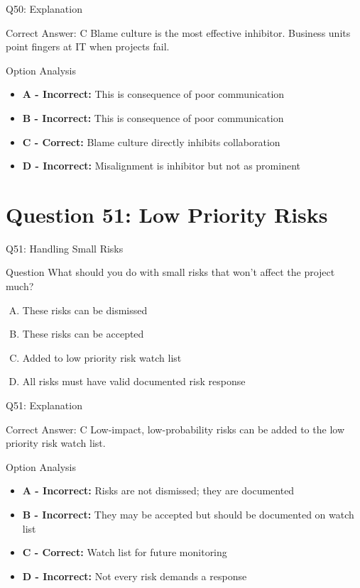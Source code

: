 \documentclass{beamer}
\begin{document}
	\begin{frame}{Q50: Explanation}
		\begin{block}{Correct Answer: C}
			Blame culture is the most effective inhibitor. Business units point fingers at IT when projects fail.
		\end{block}
		\begin{block}{Option Analysis}
			\begin{itemize}
				\item \textbf{A - Incorrect:} This is consequence of poor communication
				\item \textbf{B - Incorrect:} This is consequence of poor communication
				\item \textbf{C - Correct:} Blame culture directly inhibits collaboration
				\item \textbf{D - Incorrect:} Misalignment is inhibitor but not as prominent
			\end{itemize}
		\end{block}
	\end{frame}
	
	\section{Question 51: Low Priority Risks}
	
	\begin{frame}{Q51: Handling Small Risks}
		\begin{block}{Question}
			What should you do with small risks that won't affect the project much?
		\end{block}
		\begin{enumerate}[(A)]
			\item These risks can be dismissed
			\item These risks can be accepted
			\item Added to low priority risk watch list
			\item All risks must have valid documented risk response
		\end{enumerate}
	\end{frame}
	
	\begin{frame}{Q51: Explanation}
		\begin{block}{Correct Answer: C}
			Low-impact, low-probability risks can be added to the low priority risk watch list.
		\end{block}
		\begin{block}{Option Analysis}
			\begin{itemize}
				\item \textbf{A - Incorrect:} Risks are not dismissed; they are documented
				\item \textbf{B - Incorrect:} They may be accepted but should be documented on watch list
				\item \textbf{C - Correct:} Watch list for future monitoring
				\item \textbf{D - Incorrect:} Not every risk demands a response
			\end{itemize}
		\end{block}
	\end{frame}
	
\end{document}

